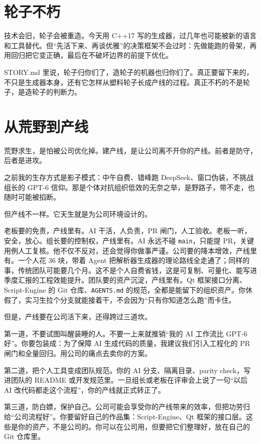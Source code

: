 \section{轮子不朽}

技术会旧，轮子会被重造。今天用 C++17 写的生成器，过几年也可能被新的语言和工具替代。但“先活下来、再谈优雅”的决策框架不会过时：先做能跑的骨架，再用回归把它变正确，最后在不破坏边界的前提下优化。

STORY.md 里说，轮子归你们了，造轮子的机器也归你们了。真正要留下来的，不只是生成器本身，还有它怎样从塑料轮子长成产线的过程。真正不朽的不是轮子，是造轮子的判断力。

\section{从荒野到产线}

荒野求生，是怕被公司优化掉。建产线，是让公司离不开你的产线。前者是防守，后者是进攻。

之前我的生存方式是影子模式：中午自费、错峰跑 DeepSeek、窗口伪装，不挑战组长的 GPT-6 信仰。那是个体对抗组织低效的无奈之举，是野路子，带不走，也随时可能被掐断。

但产线不一样。它天生就是为公司环境设计的。

老板要的免责，产线里有。AI 干活，人负责，PR 闸门，人工验收。老板一听，安全，放心。组长要的控制权，产线里有。AI 永远不碰 \texttt{main}，只能提 PR，关键用例人工复核。他不仅不反对，还会觉得你做事严谨。公司要的降本增效，产线里有。一个人花 36 块，带着 Agent 把解析器生成器的理论路线全走通了；同样的事，传统团队可能要几个月。这不是个人自费省钱，这是可复制、可量化、能写进季度汇报的工程效能提升。团队要的资产沉淀，产线里有。Qt 框架接口分离、Script-Engine 的 Git 仓库、\texttt{AGENTS.md} 的规范，全都是能留下的组织资产。你休假了，实习生拉个分支就能接着干，不会因为“只有你知道怎么跑”而卡住。

但是，产线要在公司活下来，还得跨过三道坎。

第一道，不要试图叫醒装睡的人。不要一上来就推销“我的 AI 工作流比 GPT-6 好”。你要包装成：为了保障 AI 生成代码的质量，我建议我们引入工程化的 PR 闸门和全量回归。用公司的痛点去卖你的方案。

第二道，把个人工具变成团队规范。你的 AI 分支、隔离目录、parity check，写进团队的 README 或开发规范里。一旦组长或老板在评审会上说了一句“以后 AI 改代码都走这个流程”，你的产线就正式转正了。

第三道，防白嫖，保护自己。公司可能会享受你的产线带来的效率，但把功劳归给“公司流程好”。你要留好自己的作品集：Script-Engine、Qt 框架的接口层。这些是你的资产，不是公司的。你可以在公司用，但要把它们整理好，放在自己的 Git 仓库里。

